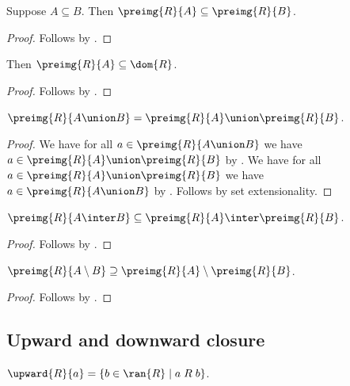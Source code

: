 \begin{proposition}\label{preimg_subseteq}
    Suppose $A\subseteq B$.
    Then $\preimg{R}{A}\subseteq \preimg{R}{B}$.
\end{proposition}
\begin{proof}
    Follows by .
\end{proof}

\begin{proposition}\label{preimg_subseteq_dom}
    Then $\preimg{R}{A}\subseteq \dom{R}$.
\end{proposition}
\begin{proof}
    Follows by .
\end{proof}

\begin{proposition}\label{preimg_union}
    $\preimg{R}{A\union B} = \preimg{R}{A}\union\preimg{R}{B}$.
\end{proposition}
\begin{proof}
    We have for all $a\in\preimg{R}{A\union B}$
        we have $a\in\preimg{R}{A}\union\preimg{R}{B}$
        by .
    We have for all $a\in\preimg{R}{A}\union\preimg{R}{B}$
        we have $a\in\preimg{R}{A\union B}$
        by .
    Follows by set extensionality.
\end{proof}

\begin{proposition}\label{preimg_inter}
    $\preimg{R}{A\inter B}\subseteq \preimg{R}{A}\inter\preimg{R}{B}$.
\end{proposition}
\begin{proof}
    Follows by .
\end{proof}

\begin{proposition}\label{preimg_setminus}
    $\preimg{R}{A\setminus B}\supseteq \preimg{R}{A}\setminus\preimg{R}{B}$.
\end{proposition}
\begin{proof}
    Follows by .
\end{proof}

\subsection{Upward and downward closure}

\begin{definition}\label{upward_closure}
    $\upward{R}{a} = \{b\in\ran{R} \mid a\mathrel{R}b \}$.
\end{definition}

